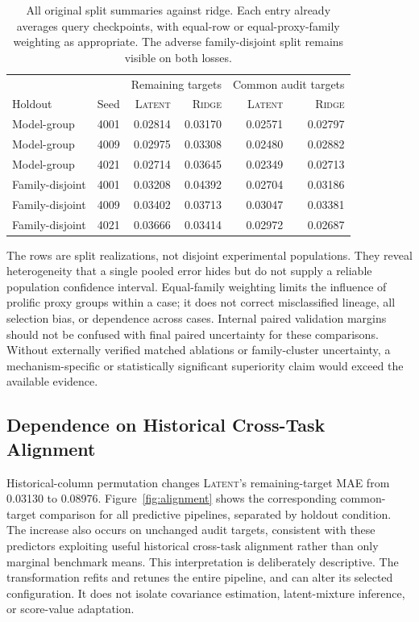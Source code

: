 \documentclass{article}
\newcommand{\latent}{\textsc{Latent}}
\newcommand{\ridge}{\textsc{Ridge}}
\begin{document}
\begin{table}[t]
\centering
\caption{All original split summaries against ridge. Each entry already averages query checkpoints, with equal-row or equal-proxy-family weighting as appropriate. The adverse family-disjoint split remains visible on both losses.}
\label{tab:splits}
\begin{tabular}{llrrrr}
\toprule
& & \multicolumn{2}{c}{Remaining targets} & \multicolumn{2}{c}{Common audit targets} \\
Holdout & Seed & \latent & \ridge & \latent & \ridge \\
\midrule
Model-group & 4001 & 0.02814 & 0.03170 & 0.02571 & 0.02797 \\
Model-group & 4009 & 0.02975 & 0.03308 & 0.02480 & 0.02882 \\
Model-group & 4021 & 0.02714 & 0.03645 & 0.02349 & 0.02713 \\
Family-disjoint & 4001 & 0.03208 & 0.04392 & 0.02704 & 0.03186 \\
Family-disjoint & 4009 & 0.03402 & 0.03713 & 0.03047 & 0.03381 \\
Family-disjoint & 4021 & 0.03666 & 0.03414 & 0.02972 & 0.02687 \\
\bottomrule
\end{tabular}
\end{table}

The rows are split realizations, not disjoint experimental populations. They reveal heterogeneity that a single pooled error hides but do not supply a reliable population confidence interval. Equal-family weighting limits the influence of prolific proxy groups within a case; it does not correct misclassified lineage, all selection bias, or dependence across cases. Internal paired validation margins should not be confused with final paired uncertainty for these comparisons. Without externally verified matched ablations or family-cluster uncertainty, a mechanism-specific or statistically significant superiority claim would exceed the available evidence.

\subsection{Dependence on Historical Cross-Task Alignment}
Historical-column permutation changes \latent's remaining-target MAE from 0.03130 to 0.08976. Figure~\ref{fig:alignment} shows the corresponding common-target comparison for all predictive pipelines, separated by holdout condition. The increase also occurs on unchanged audit targets, consistent with these predictors exploiting useful historical cross-task alignment rather than only marginal benchmark means. This interpretation is deliberately descriptive. The transformation refits and retunes the entire pipeline, and can alter its selected configuration. It does not isolate covariance estimation, latent-mixture inference, or score-value adaptation.
\end{document}
